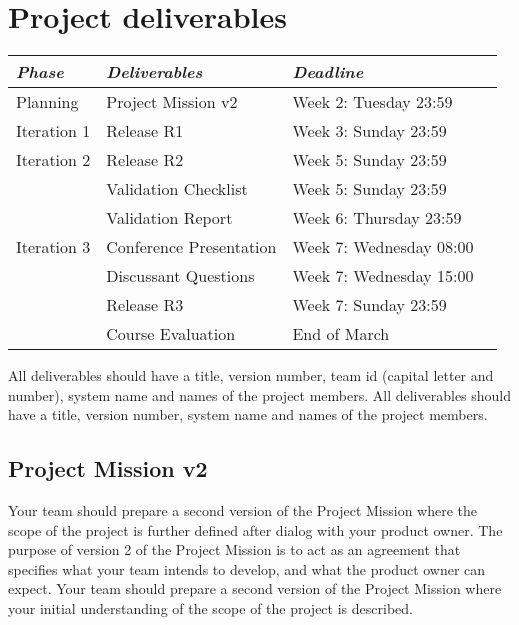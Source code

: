\ifteknolog
\newcommand{\ITERATIONTHREE}{
 Iteration 3 & Conference Presentation & Week 7: Wednesday 08:00\\
      & Discussant Questions & Week 7: Wednesday 15:00\\
      & Release R3 & Week 7: Sunday 23:59\\
}
\else
\newcommand{\ITERATIONTHREE}{
    Iteration 3 & Release R3 & Week 7: Sunday 23:59\\
}
\fi

\section{Project deliverables}
\begin{tabular}{l |l p{5cm}  l}
{\it Phase} & {\it Deliverables} & {\it Deadline} \\
\hline
Planning & Project Mission v2& Week 2: Tuesday 23:59\\
Iteration 1 & Release R1 & Week 3: Sunday 23:59 \\
Iteration 2 & Release R2  & Week 5: Sunday 23:59\\
   & Validation Checklist & Week 5: Sunday 23:59\\
   & Validation Report & Week 6: Thursday 23:59\\
\ITERATIONTHREE
& Course Evaluation & End of March\\

\end{tabular}
\vskip3mm

\ifteknolog
   \noindent All deliverables should have a title, version number, team id (capital letter and number), system name and names of the project members. 
\else
   \noindent All deliverables should have a title, version number, system name and names of the project members.
\fi

\subsection{Project Mission v2}
\ifteknolog
   Your team should prepare a second version of the Project Mission where the scope of the project is further defined after dialog with your product owner. The purpose of version 2 of the Project Mission is to act as an agreement that specifies what your team intends to develop, and what the product owner can expect.
\else
   Your team should prepare a second version of the Project Mission where your initial understanding of the scope of the project is described. 
\fi

